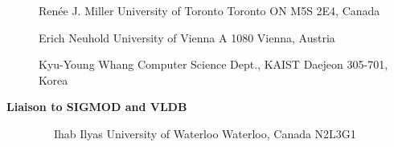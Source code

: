 \documentclass[10pt,twocolumn]{article}
\begin{document}
\begin{description}
Ren\'{e}e J. Miller \newline
University of Toronto \newline
Toronto ON M5S 2E4, Canada
\vspace{.05cm}

Erich Neuhold                  \newline
University of Vienna  \newline
A 1080 Vienna, Austria             
\vspace{.05cm}

Kyu-Young Whang 				\newline
Computer Science Dept., KAIST	\newline
Daejeon 305-701, Korea\newline
\vspace{-.05cm}

\item[{\bf Liaison to SIGMOD and VLDB}]
\verb-  -                      \newline
Ihab Ilyas \newline
University of Waterloo \newline
Waterloo, Canada N2L3G1

\verb-  -                      \newline
\end{description}
\end{document}
